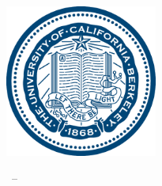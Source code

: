 
\begin{titlepage}

\begin{addmargin}[-1cm]{-3cm}
\begin{center}
\large

\hfill
\vfill

\begingroup
\color{title}\Large\spacedallcaps{\myTitle} \\ \bigskip %
\endgroup

\spacedallcaps{\myName} %

\vfill

\includegraphics[width=5cm]{figures/ucberkeleyseal_line_540.eps} \\ \medskip %


\myTime\ -- \myVersion %

\vfill

\end{center}
\end{addmargin}

\end{titlepage}
